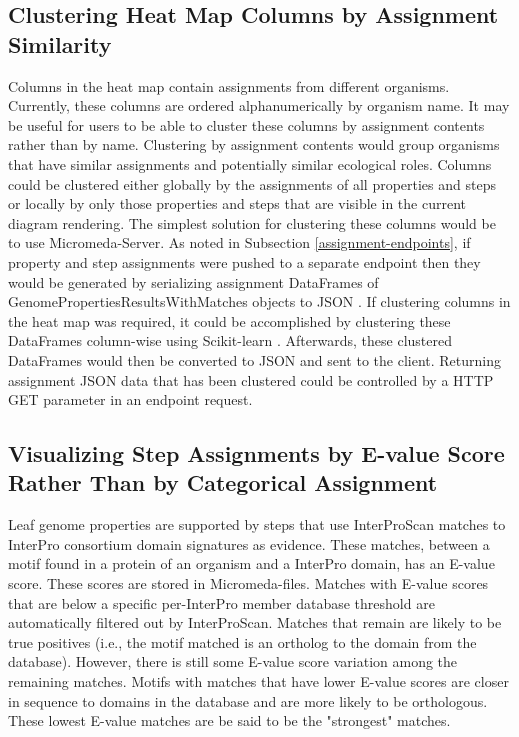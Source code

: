 \subsection{Clustering Heat Map Columns by Assignment Similarity}

Columns in the heat map contain assignments from different organisms. Currently, these columns are ordered alphanumerically by organism name. It may be useful for users to be able to cluster these columns by assignment contents rather than by name. Clustering by assignment contents would group organisms that have similar assignments and potentially similar ecological roles. Columns could be clustered either globally by the assignments of all properties and steps or locally by only those properties and steps that are visible in the current diagram rendering. The simplest solution for clustering these columns would be to use Micromeda-Server. As noted in Subsection \ref{assignment-endpoints}, if property and step assignments were pushed to a separate endpoint then they would be generated by serializing assignment DataFrames of GenomePropertiesResultsWithMatches objects to JSON \cite{bray2014rfc}. If clustering columns in the heat map was required, it could be accomplished by clustering these DataFrames column-wise using Scikit-learn \cite{pedregosa2011scikit}. Afterwards, these clustered DataFrames would then be converted to JSON and sent to the client. Returning assignment JSON data that has been clustered could be controlled by a HTTP GET parameter in an endpoint request.

\subsection{Visualizing Step Assignments by E-value Score Rather Than by Categorical Assignment} \label{interface-e-value}

Leaf genome properties are supported by steps that use InterProScan matches to InterPro consortium domain signatures as evidence. These matches, between a motif found in a protein of an organism and a InterPro domain, has an E-value score. These scores are stored in Micromeda-files. Matches with E-value scores that are below a specific per-InterPro member database threshold are automatically filtered out by InterProScan. Matches that remain are likely to be true positives (i.e., the motif matched is an ortholog to the domain from the database). However, there is still some E-value score variation among the remaining matches. Motifs with matches that have lower E-value scores are closer in sequence to domains in the database and are more likely to be orthologous. These lowest E-value matches are be said to be the "strongest" matches.


